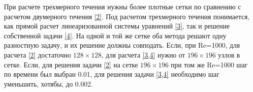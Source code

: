 При расчете трехмерного течения нужны более плотные сетки по сравнению с расчетом двумерного течения \ref{2}. Под расчетом трехмерного течения понимается, как прямой расчет линеаризованной системы уравнений \ref{3}, так и решение собственной задачи \ref{4}. На одной и той же сетке оба метода решают одну разностную задачу, и их решение должны совподать. Если, при Re=1000, для расчета \ref{2} достаточно $128 \times 128$, для расчета \ref{3,4} нужно от $196 \times 196$ узлов в сетке. Если, для решения задачи \ref{2} на сетке $196 \times 196$ при том же Re=1000 шаг по времени был выбран 0.01, для решения задачи \ref{3,4} необходимо шаг уменьшить, хотябы, до 0.002.  

\newpage
